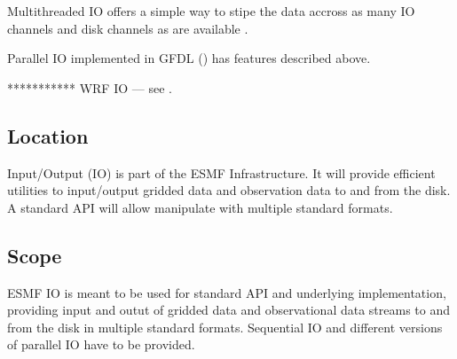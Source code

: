 Multithreaded IO offers a simple way to stipe the data accross as many
IO channels and disk channels as are available \cite{
Balaji_Parallel_IO_1999, Balaji_Parallel_IO_2000}.

Parallel IO implemented in GFDL (\cite{mpp_io}) has features described
above.



*********** WRF IO --- see \cite{WRF-Software}.


\subsection{Location}

Input/Output (IO) is part of the ESMF Infrastructure.  It will provide
efficient utilities to input/output gridded data and observation data
to and from the disk. A standard API will allow manipulate with multiple
standard formats.


\subsection{Scope}

ESMF IO is meant to be used for standard API and underlying
implementation, providing input and outut of gridded data and
observational data streams to and from the disk in multiple standard
formats. Sequential IO and different versions of parallel IO have to
be provided.  


















